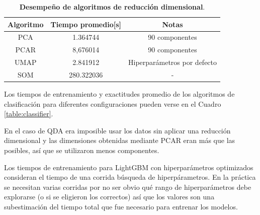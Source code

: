 \documentclass[12pt]{article}
\begin{document}
\begin{table}[htbp]
\centering
\begin{tabular}{|c|c|c|}
\hline
Algoritmo                        & Tiempo promedio[s] & Notas \\ \hline
PCA                      & 1.364744 & 90 componentes      \\ \hline
PCAR                      & 8,676014 & 90 componentes      \\ \hline
UMAP                       & 2.841912 & Hiperparámetros por defecto \\ \hline
SOM                       & 280.322036 & -      \\ \hline
\end{tabular}
\caption{\textbf{Desempeño de algoritmos de reducción dimensional}.}
\label{table:dimensional_reduction}
\end{table}

Los tiempos de entrenamiento y exactitudes promedio de los algoritmos de clasificación para diferentes configuraciones pueden verse en el Cuadro \ref{table:classifier}. 

En el caso de QDA era imposible usar los datos sin aplicar una reducción dimensional y las dimensiones obtenidas mediante PCAR eran más que las posibles, así que se utilizaron menos componentes. 

Los tiempos de entrenamiento para LightGBM con hiperparámetros optimizados consideran el tiempo de una corrida búsqueda de hiperpárametros. En la práctica se necesitan varias corridas por no ser obvio qué rango de hiperparámetros debe explorarse (o si se eligieron los correctos) así que los valores son una subestimación del tiempo total que fue necesario para entrenar los modelos.
\end{document}

